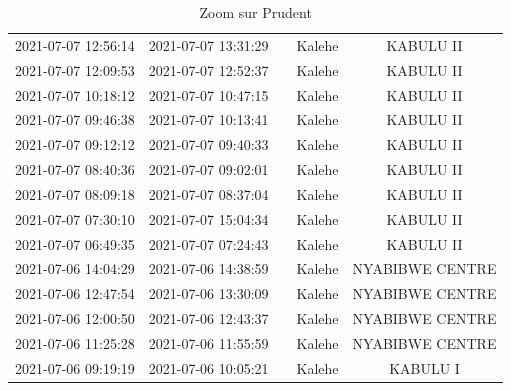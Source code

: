 \documentclass[
]{book}
\begin{document}
\begin{table}

\caption{\label{tab:unnamed-chunk-13}Zoom sur Prudent}
\centering
\begin{tabular}[t]{c|c|>{}c|c|c}
\hline
\cellcolor{red}{start} & \cellcolor{red}{end} & \cellcolor{red}{temps} & \cellcolor{red}{Territoire} & \cellcolor{red}{Village}\\
\hline
2021-07-07 12:56:14 & 2021-07-07 13:31:29 & \cellcolor[HTML]{FDE725}{\textcolor{white}{35}} & Kalehe & KABULU II\\
\hline
2021-07-07 12:09:53 & 2021-07-07 12:52:37 & \cellcolor[HTML]{2A788E}{\textcolor{white}{43}} & Kalehe & KABULU II\\
\hline
2021-07-07 10:18:12 & 2021-07-07 10:47:15 & \cellcolor[HTML]{440154}{\textcolor{white}{29}} & Kalehe & KABULU II\\
\hline
2021-07-07 09:46:38 & 2021-07-07 10:13:41 & \cellcolor[HTML]{365C8D}{\textcolor{white}{27}} & Kalehe & KABULU II\\
\hline
2021-07-07 09:12:12 & 2021-07-07 09:40:33 & \cellcolor[HTML]{414487}{\textcolor{white}{28}} & Kalehe & KABULU II\\
\hline
2021-07-07 08:40:36 & 2021-07-07 09:02:01 & \cellcolor[HTML]{69CD5B}{\textcolor{white}{21}} & Kalehe & KABULU II\\
\hline
2021-07-07 08:09:18 & 2021-07-07 08:37:04 & \cellcolor[HTML]{482071}{\textcolor{white}{28}} & Kalehe & KABULU II\\
\hline
2021-07-07 07:30:10 & 2021-07-07 15:04:34 & \cellcolor[HTML]{482979}{\textcolor{white}{454}} & Kalehe & KABULU II\\
\hline
2021-07-07 06:49:35 & 2021-07-07 07:24:43 & \cellcolor[HTML]{2A788E}{\textcolor{white}{35}} & Kalehe & KABULU II\\
\hline
2021-07-06 14:04:29 & 2021-07-06 14:38:59 & \cellcolor[HTML]{20938C}{\textcolor{white}{34}} & Kalehe & NYABIBWE CENTRE\\
\hline
2021-07-06 12:47:54 & 2021-07-06 13:30:09 & \cellcolor[HTML]{2A788E}{\textcolor{white}{42}} & Kalehe & NYABIBWE CENTRE\\
\hline
2021-07-06 12:00:50 & 2021-07-06 12:43:37 & \cellcolor[HTML]{2C718E}{\textcolor{white}{43}} & Kalehe & NYABIBWE CENTRE\\
\hline
2021-07-06 11:25:28 & 2021-07-06 11:55:59 & \cellcolor[HTML]{2C718E}{\textcolor{white}{31}} & Kalehe & NYABIBWE CENTRE\\
\hline
2021-07-06 09:19:19 & 2021-07-06 10:05:21 & \cellcolor[HTML]{306A8E}{\textcolor{white}{46}} & Kalehe & KABULU I\\

\end{tabular}
\end{table}
\end{document}
